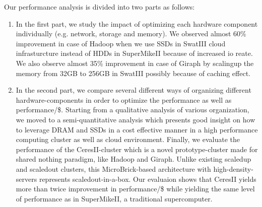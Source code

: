 \documentclass[conference]{IEEEtran}
\begin{document}
Our performance analysis is divided into two parts as follows:
\begin{enumerate}
\item In the first part, we study the impact of optimizing each hardware component individually (e.g. network, storage and memory). 
We observed almost 60\% improvement in case of Hadoop when we use SSDs in SwatIII cloud infrasturcture instead of HDDs in SuperMikeII because of increased io reate.
We also observe almost 35\% improvement in case of Giraph by scalingup the memory from 32GB to 256GB in SwatIII possibly because of caching effect.
\item In the second part, we compare several different ways of organizing different hardware-components in order to optimize the performance as well as performance/\$. 
Starting from a qualitative analysis of various organization, we moved to a semi-quantitative analysis which presents good insight on how to leverage DRAM and SSDs in a cost effective manner in a high performance computing cluster as well as cloud environment. 
Finally, we evaluate the performance of the CeresII-cluster which is a novel prototype-cluster made for shared nothing paradigm, like Hadoop and Giraph. 
Unlike existing scaledup and scaledout clusters, this MicroBrick-based architecture with high-density-servers represents scaledout-in-a-box. 
Our evaluaion shows that CeresII yields more than twice improvement in performance/\$ while yielding the same level of performance as in SuperMikeII, a traditional supercomputer. 
\end{enumerate}
\end{document}
